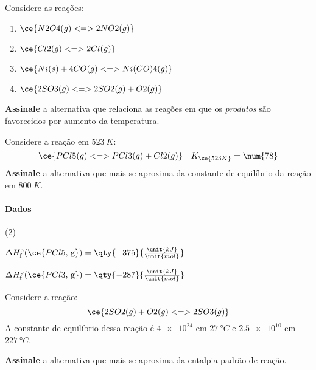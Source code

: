 \begin{problem}[
	id={2F36},
	path={/home/braun/Documents/Developer/braunchem/data/problems/Q2/2F/2F36}
]
Considere as reações:

\begin{enumerate}
\def\labelenumi{\arabic{enumi}.}
\tightlist
\item
  {\(\ce{ N2O4(g) <=> 2 NO2(g) }\)}
\item
  {\(\ce{ Cl2(g) <=> 2 Cl(g) }\)}
\item
  {\(\ce{ Ni(s) + 4 CO(g) <=> Ni(CO)4(g) }\)}
\item
  {\(\ce{ 2 SO3(g) <=> 2 SO2(g) + O2(g) }\)}
\end{enumerate}

\textbf{Assinale} a alternativa que relaciona as reações em que os \emph{produtos} são favorecidos por aumento da temperatura.
\end{problem}


\begin{problem}[
	id={2F37},
	path={/home/braun/Documents/Developer/braunchem/data/problems/Q2/2F/2F37}
]
Considere a reação em {\(\qty{523}{\unit{K}}\)}: {\[
    \ce{ PCl5(g) <=> PCl3(g) + Cl2(g) } \quad K_{\ce{523 K}} =
\num{78}
\]} \textbf{Assinale} a alternativa que mais se aproxima da constante de equilíbrio da reação em {\(\qty{800}{\unit{K}}\)}.
\paragraph{Dados}\small 
\begin{datalist}
[start = 1](2)\item $\Delta H_\mathrm{f}^{\circ}(\ce{PCl5,\,\text{g}}) = \qty{-375}{\tfrac{\unit{kJ}}{\unit{mol}}}$
\item $\Delta H_\mathrm{f}^{\circ}(\ce{PCl3,\,\text{g}}) = \qty{-287}{\tfrac{\unit{kJ}}{\unit{mol}}}$
\end{datalist}

\end{problem}


\begin{problem}[
	id={2F38},
	path={/home/braun/Documents/Developer/braunchem/data/problems/Q2/2F/2F38}
]
Considere a reação: {\[
\ce{ 2 SO2(g) + O2(g) <=> 2 SO3(g) }
\]} A constante de equilíbrio dessa reação é {\(\num{4e24}\)} em {\(\qty{27}{\unit{\degree C}}\)} e {\(\num{2,5e10}\)} em
{\(\qty{227}{\unit{\degree C}}\)}.

\textbf{Assinale} a alternativa que mais se aproxima da entalpia padrão de reação.
\end{problem}

